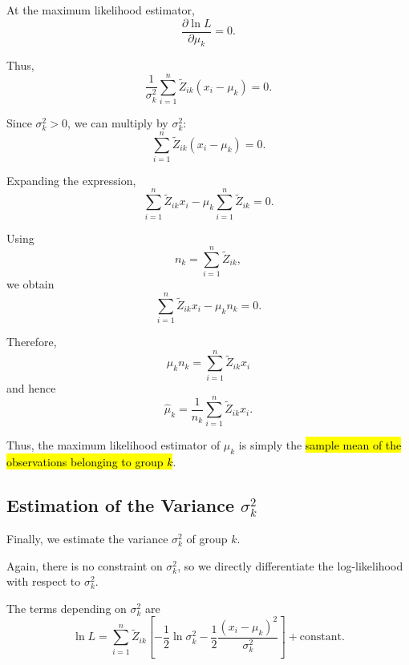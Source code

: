 At the maximum likelihood estimator,
\begin{equation*}
\frac{\partial\ln L}{\partial\mu_k}=0.
\end{equation*}

Thus,
\begin{equation*}
\frac{1}{\sigma_k^2}
\sum_{i=1}^n
\tilde{Z}_{ik}(x_i-\mu_k)
=
0.
\end{equation*}

Since $\sigma_k^2>0$, we can multiply by $\sigma_k^2$:
\begin{equation*}
\sum_{i=1}^n
\tilde{Z}_{ik}(x_i-\mu_k)
=
0.
\end{equation*}

Expanding the expression,
\begin{equation*}
\sum_{i=1}^n
\tilde{Z}_{ik}x_i
-
\mu_k
\sum_{i=1}^n
\tilde{Z}_{ik}
=
0.
\end{equation*}

Using
\begin{equation*}
n_k=\sum_{i=1}^n\tilde{Z}_{ik},
\end{equation*}
we obtain
\begin{equation*}
\sum_{i=1}^n
\tilde{Z}_{ik}x_i
-
\mu_kn_k
=
0.
\end{equation*}

Therefore,
\begin{equation*}
\mu_kn_k
=
\sum_{i=1}^n
\tilde{Z}_{ik}x_i
\end{equation*}
and hence
\begin{equation*}
\boxed{
\hat{\mu}_k
=
\frac{1}{n_k}
\sum_{i=1}^n
\tilde{Z}_{ik}x_i
}.
\end{equation*}

Thus, the maximum likelihood estimator of $\mu_k$ is simply the
\hl{sample mean of the observations belonging to group $k$}.

\subsection{Estimation of the Variance $\sigma_k^2$}

Finally, we estimate the variance $\sigma_k^2$ of group $k$.

Again, there is no constraint on $\sigma_k^2$, so we directly
differentiate the log-likelihood with respect to $\sigma_k^2$.

The terms depending on $\sigma_k^2$ are
\begin{equation*}
\ln L
=
\sum_{i=1}^n
\tilde{Z}_{ik}
\left[
-\frac{1}{2}\ln\sigma_k^2
-\frac{1}{2}
\frac{(x_i-\mu_k)^2}{\sigma_k^2}
\right]
+
\text{constant}.
\end{equation*}

